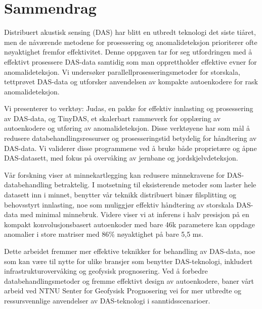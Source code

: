 \chapter*{Sammendrag}

Distribuert akustisk sensing (DAS) har blitt en utbredt teknologi det siste tiåret, men de nåværende metodene for prosessering og anomalideteksjon prioriterer ofte nøyaktighet fremfor effektivitet. Denne oppgaven tar for seg utfordringen med å effektivt prosessere DAS-data samtidig som man opprettholder effektive evner for anomalideteksjon. Vi undersøker parallellprosesseringsmetoder for storskala, tettprøvet DAS-data og utforsker anvendelsen av kompakte autoenkodere for rask anomalideteksjon.

Vi presenterer to verktøy: Judas, en pakke for effektiv innlasting og prosessering av DAS-data, og TinyDAS, et skalerbart rammeverk for opplæring av autoenkodere og utføring av anomalideteksjon. Disse verktøyene har som mål å redusere databehandlingsressurser og prosesseringstid betydelig for håndtering av DAS-data. Vi validerer disse programmene ved å bruke både proprietære og åpne DAS-datasett, med fokus på overvåking av jernbane og jordskjelvdeteksjon.

Vår forskning viser at minnekartlegging kan redusere minnekravene for DAS-databehandling betraktelig. I motsetning til eksisterende metoder som laster hele datasett inn i minnet, benytter vår teknikk distribuert binær filsplitting og behovsstyrt innlasting, noe som muliggjør effektiv håndtering av storskala DAS-data med minimal minnebruk. Videre viser vi at inferens i halv presisjon på en kompakt konvolusjonsbasert autoenkoder med bare 46k parametere kan oppdage anomalier i store matriser med 86\% nøyaktighet på bare 5,5 ms.

Dette arbeidet fremmer mer effektive teknikker for behandling av DAS-data, noe som kan være til nytte for ulike bransjer som benytter DAS-teknologi, inkludert infrastrukturovervåking og geofysisk prognosering. Ved å forbedre databehandlingsmetoder og fremme effektivt design av autoenkodere, baner vårt arbeid ved NTNU Senter for Geofysisk Prognosering vei for mer utbredte og ressursvennlige anvendelser av DAS-teknologi i sanntidsscenarioer.


